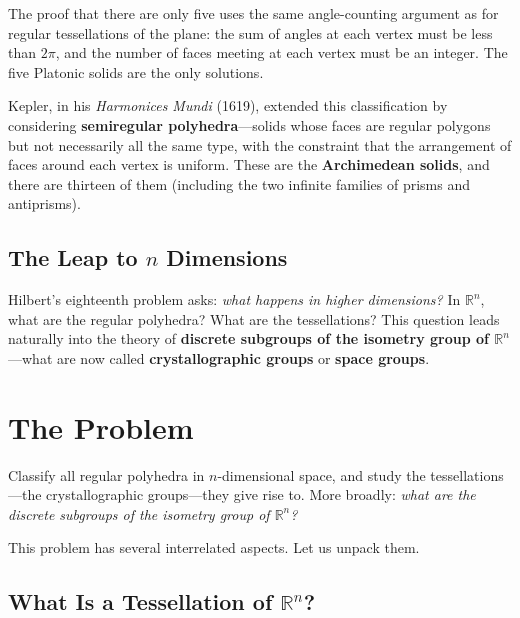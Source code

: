 The proof that there are only five uses the same angle-counting argument as for regular tessellations of the plane: the sum of angles at each vertex must be less than $2\pi$, and the number of faces meeting at each vertex must be an integer. The five Platonic solids are the only solutions.

Kepler, in his \emph{Harmonices Mundi} (1619), extended this classification by considering \textbf{semiregular polyhedra}---solids whose faces are regular polygons but not necessarily all the same type, with the constraint that the arrangement of faces around each vertex is uniform. These are the \textbf{Archimedean solids}, and there are thirteen of them (including the two infinite families of prisms and antiprisms).

\subsection{The Leap to \texorpdfstring{$n$}{n} Dimensions}

Hilbert's eighteenth problem asks: \emph{what happens in higher dimensions?} In $\mathbb{R}^n$, what are the regular polyhedra? What are the tessellations? This question leads naturally into the theory of \textbf{discrete subgroups of the isometry group of $\mathbb{R}^n$}---what are now called \textbf{crystallographic groups} or \textbf{space groups}.

\section{The Problem}

\begin{problem_statement}
Classify all regular polyhedra in $n$-dimensional space, and study the tessellations---the crystallographic groups---they give rise to. More broadly: \emph{what are the discrete subgroups of the isometry group of $\mathbb{R}^n$?}
\end{problem_statement}

This problem has several interrelated aspects. Let us unpack them.

\subsection{What Is a Tessellation of \texorpdfstring{$\mathbb{R}^n$}{R^n}?}

